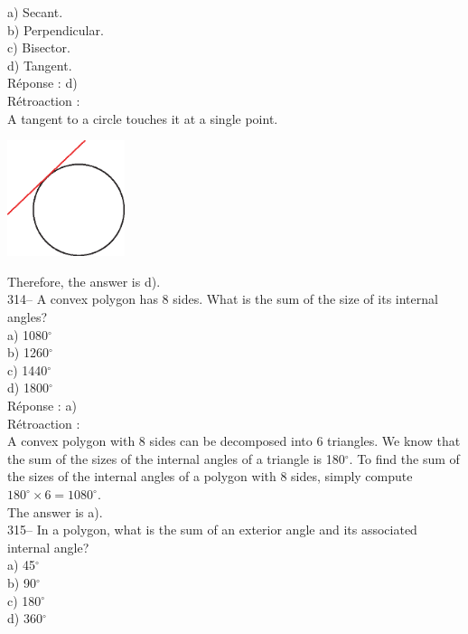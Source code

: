 \documentclass[letterpaper, 12pt]{article}
\begin{document}
a) Secant.\\
b) Perpendicular.\\
c) Bisector.\\
d) Tangent.\\

R\'eponse : d)\\

R\'etroaction :\\
A tangent to a circle touches it at a single point.
   \begin{center}
    \includegraphics[height=3.39cm]{313.eps}
    \end{center}
Therefore, the answer is d).\\

314-- A convex polygon has 8 sides. What is the sum of the size of its internal angles?\\

a) 1080$^{\circ}$\\
b) 1260$^{\circ}$\\
c) 1440$^{\circ}$\\
d) 1800$^{\circ}$\\


R\'eponse : a)\\

R\'etroaction : \\
A convex polygon with 8 sides can be decomposed into 6 triangles. We
know that the sum of the sizes of the internal angles of a triangle
is 180$^{\circ}$. To find the sum of the sizes of the internal
angles of a polygon with 8 sides, simply
compute $180^{\circ}\times6=1080^{\circ}$.\\
The answer is a).\\

315-- In a polygon, what is the sum of an exterior angle and its associated internal angle?\\

a) 45$^{\circ}$\\
b) 90$^{\circ}$\\
c) 180$^{\circ}$\\
d) 360$^{\circ}$\\
\end{document}

